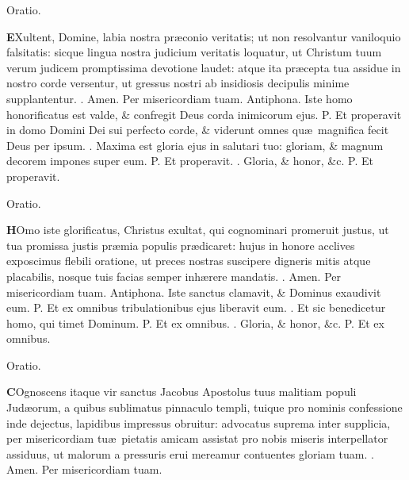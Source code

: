\documentclass[letter,11pt]{book}
\makeatletter
\DeclareRobustCommand{\Vbar}{\vers@resp{-0.1em}{V}}
\DeclareRobustCommand{\Rbar}{\vers@resp{0pt}{R}}
\newcommand{\vers@resp@sym}{\raisebox{0.2ex}{\rotatebox[origin=c]{-20}{$\m@th\rceil$}}}
\newcommand{\vers@resp}[2]{%
  {\ooalign{\hidewidth\kern#1\vers@resp@sym\hidewidth\cr#2\cr}}%
}%
\def\P{\color{Red} P. \color{black}}
\def\V{\color{Red} \Vbar . \color{black}}
\def\R{\color{Red} \Rbar . \color{black}}
\makeatother
\begin{document}
\begin{multicols*}{2}
\vspace{-.5em} \begin{center} \color{Red} Oratio. \color{black} \end{center} \vspace{-.5em}
\lettrine[lines=2]{\bfseries \color{Red} E}{}Xultent, Domine, labia nostra pr\ae conio veritatis; ut non resolvantur vaniloquio falsitatis: sicque lingua nostra judicium veritatis loquatur, ut Christum tuum verum judicem promptissima devotione laudet: atque ita pr\ae cepta tua assidue in nostro corde versentur, ut gressus nostri ab insidiosis decipulis minime supplantentur. \R Amen. Per misericordiam tuam.
\newline \color{Red} Antiphona. \color{black} Iste homo honorificatus est valde, \& confregit Deus corda inimicorum ejus. \P Et properavit in domo Domini Dei sui perfecto corde, \& viderunt omnes qu\ae \ magnifica fecit Deus per ipsum. \V Maxima est gloria ejus in salutari tuo: gloriam, \& magnum decorem impones super eum. \P Et properavit. \V Gloria, \& honor, \&c. \P Et properavit.
\vspace{-.5em} \begin{center} \color{Red} Oratio. \color{black} \end{center} \vspace{-.5em}
\lettrine[lines=2]{\bfseries \color{Red} H}{}Omo iste glorificatus, Christus exultat, qui cognominari promeruit justus, ut tua promissa justis pr\ae mia populis pr\ae dicaret: hujus in honore acclives exposcimus flebili oratione, ut preces nostras suscipere digneris mitis atque placabilis, nosque tuis facias semper inh\ae rere mandatis. \R Amen. Per misericordiam tuam.
\newline \color{Red} Antiphona. \color{black} Iste sanctus clamavit, \& Dominus exaudivit eum. \P Et ex omnibus tribulationibus ejus liberavit eum. \V Et sic benedicetur homo, qui timet Dominum. \P Et ex omnibus. \V Gloria, \& honor, \&c. \P Et ex omnibus.
\vspace{-.5em} \begin{center} \color{Red} Oratio. \color{black} \end{center} \vspace{-.5em}
\lettrine[lines=2]{\bfseries \color{Red} C}{}Ognoscens itaque vir sanctus Jacobus Apostolus tuus malitiam populi Jud\ae orum, a quibus sublimatus pinnaculo templi, tuique pro nominis confessione inde dejectus, lapidibus impressus obruitur: advocatus suprema inter supplicia, per misericordiam tu\ae \ pietatis amicam assistat pro nobis miseris interpellator assiduus, ut malorum a pressuris erui mereamur contuentes gloriam tuam. \R Amen. Per misericordiam tuam.

\end{multicols*}
\end{document}
